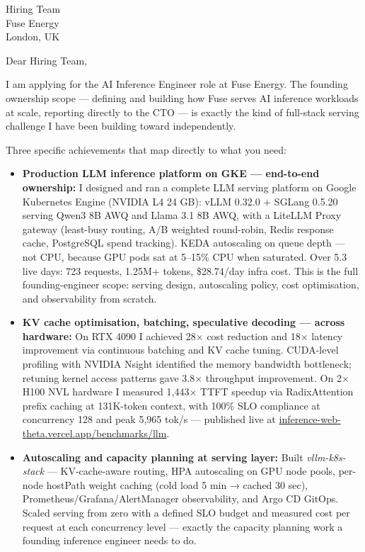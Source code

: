 \documentclass[12pt,a4paper]{letter}
\date{\today}
\begin{document}
\begin{letter}{Hiring Team \\ Fuse Energy \\ London, UK}

\opening{Dear Hiring Team,}

I am applying for the AI Inference Engineer role at Fuse Energy. The founding ownership scope — defining and building how Fuse serves AI inference workloads at scale, reporting directly to the CTO — is exactly the kind of full-stack serving challenge I have been building toward independently.

Three specific achievements that map directly to what you need:

\begin{itemize}
  \item \textbf{Production LLM inference platform on GKE — end-to-end ownership:} I designed and ran a complete LLM serving platform on Google Kubernetes Engine (NVIDIA L4 24 GB): vLLM 0.32.0 + SGLang 0.5.20 serving Qwen3 8B AWQ and Llama 3.1 8B AWQ, with a LiteLLM Proxy gateway (least-busy routing, A/B weighted round-robin, Redis response cache, PostgreSQL spend tracking). KEDA autoscaling on queue depth — not CPU, because GPU pods sat at 5--15\% CPU when saturated. Over 5.3 live days: 723 requests, 1.25M+ tokens, \$28.74/day infra cost. This is the full founding-engineer scope: serving design, autoscaling policy, cost optimisation, and observability from scratch.

  \item \textbf{KV cache optimisation, batching, speculative decoding — across hardware:} On RTX 4090 I achieved 28$\times$ cost reduction and 18$\times$ latency improvement via continuous batching and KV cache tuning. CUDA-level profiling with NVIDIA Nsight identified the memory bandwidth bottleneck; retuning kernel access patterns gave 3.8$\times$ throughput improvement. On 2$\times$ H100 NVL hardware I measured 1,443$\times$ TTFT speedup via RadixAttention prefix caching at 131K-token context, with 100\% SLO compliance at concurrency 128 and peak 5,965 tok/s — published live at \href{https://inference-web-theta.vercel.app/benchmarks/llm}{inference-web-theta.vercel.app/benchmarks/llm}.

  \item \textbf{Autoscaling and capacity planning at serving layer:} Built \textit{vllm-k8s-stack} — KV-cache-aware routing, HPA autoscaling on GPU node pools, per-node hostPath weight caching (cold load 5 min → cached 30 sec), Prometheus/Grafana/AlertManager observability, and Argo CD GitOps. Scaled serving from zero with a defined SLO budget and measured cost per request at each concurrency level — exactly the capacity planning work a founding inference engineer needs to do.
\end{itemize}


\end{letter}
\end{document}
